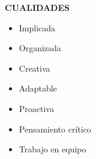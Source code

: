 \documentclass[../main.tex]{subfiles}
\begin{document}
\vspace*{0.6cm}

\textbf{\textcolor{myCV2}{CUALIDADES\underline{\hspace{6cm}}}}

    \begin{itemize}
        \vspace*{-0.2cm}
        \item Implicada
        \vspace*{-0.2cm}
        \item Organizada
        \vspace*{-0.2cm}
        \item Creativa 
        \vspace*{-0.2cm}
        \item Adaptable
        \vspace*{-0.2cm}
        \item Proactiva
        \vspace*{-0.2cm}
        \item Pensamiento crítico
        \vspace*{-0.2cm}
        \item Trabajo en equipo
    \end{itemize}
\end{document}
